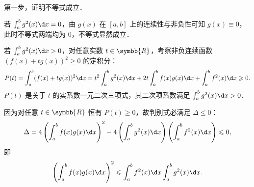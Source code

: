 \begin{myproof}
    第一步，证明不等式成立．

    若 $\int_a^b g^2(x)\d x = 0$，由 $g(x)$ 在 $[a, b]$ 上的连续性与非负性可知 $g(x) \equiv 0$，此时不等式两端均为 $0$，不等式显然成立．

    若 $\int_a^b g^2(x)\d x > 0$，对任意实数 $t \in \symbb{R}$，考察非负连续函数 $(f(x) + tg(x))^2 \geqslant 0$ 的定积分：
    \begin{equation}
        P(t) = \int_a^b (f(x) + tg(x))^2 \d x = t^2 \int_a^b g^2(x)\d x + 2t \int_a^b f(x)g(x)\d x + \int_a^b f^2(x)\d x \geqslant 0.
    \end{equation}
    $P(t)$ 是关于 $t$ 的实系数一元二次三项式，其二次项系数满足 $\int_a^b g^2(x)\d x > 0$．

    因为对任意 $t \in \symbb{R}$ 恒有 $P(t) \geqslant 0$，故判别式必满足 $\Delta \leqslant 0$：
    \begin{equation}
        \Delta = 4\left(\int_a^b f(x)g(x)\d x\right)^2 - 4\left(\int_a^b g^2(x)\d x\right)\left(\int_a^b f^2(x)\d x\right) \leqslant 0,
    \end{equation}
    即
    \begin{equation}
        \left(\int_a^b f(x)g(x)\d x\right)^2 \leqslant \int_a^b f^2(x)\d x \int_a^b g^2(x)\d x.
    \end{equation}


\end{myproof}
